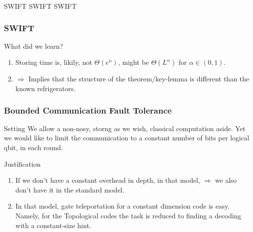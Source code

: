 \documentclass{beamer}
\begin{document}
 {SWIFT }
 {SWIFT }
 {SWIFT }

\begin{frame}
  \frametitle{SWIFT}

  \begin{block}{What did we learn?}
\begin{enumerate}
  \item Storing time is, likily, not $\Theta(e^{n})$, might be $\Theta(L^{\alpha})$ for $\alpha \in (0,1)$.   
  \item $ \Rightarrow $  Implies that the structure of the theorem/key-lemma is different than the known refrigerators.  
\end{enumerate}
  \end{block}
\end{frame}



\begin{frame}
  \frametitle{Bounded Communication Fault Tolerance} 

  \begin{block}{Setting}
    We allow a non-nosy, storng as we wish, classical computation aside. Yet we would like to limit the communication to a constant number of bits per logical qbit, in each round.
\end{block}

\begin{block}{Justification}
  \begin{enumerate}
    \item<+-> If we don't have a constant overhead in depth, in that model, $\Rightarrow$ we also don't have it in the standard model. 
    \item<+-> In that model, gate teleportation for a constant dimension code is easy. Namely, for the Topological codes the task is reduced to finding a decoding with a constant-size hint.  
  \end{enumerate}
\end{block}

\end{frame}
\end{document}
